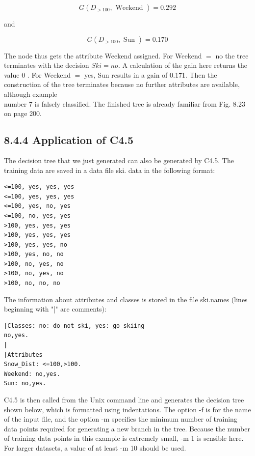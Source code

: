 \documentclass[10pt]{book}
\begin{document}
\begin{center}
\begin{enumerate}
\begin{center}
\begin{center}
$$
G\left(D_{>100}, \text { Weekend }\right)=0.292
$$

and

$$
G\left(D_{>100}, \text { Sun }\right)=0.170
$$

The node thus gets the attribute Weekend assigned. For Weekend $=$ no the tree terminates with the decision $S k i=n o$. A calculation of the gain here returns the value 0 . For Weekend $=$ yes, Sun results in a gain of 0.171. Then the construction of the tree terminates because no further attributes are available, although example\\
number 7 is falsely classified. The finished tree is already familiar from Fig. 8.23 on page 200.

\subsection*{8.4.4 Application of C4.5}
The decision tree that we just generated can also be generated by C4.5. The training data are saved in a data file ski. data in the following format:

\begin{verbatim}
<=100, yes, yes, yes
<=100, yes, yes, yes
<=100, yes, no, yes
<=100, no, yes, yes
>100, yes, yes, yes
>100, yes, yes, yes
>100, yes, yes, no
>100, yes, no, no
>100, no, yes, no
>100, no, yes, no
>100, no, no, no
\end{verbatim}

The information about attributes and classes is stored in the file ski.names (lines beginning with "|" are comments):

\begin{verbatim}
|Classes: no: do not ski, yes: go skiing
no,yes.
|
|Attributes
Snow_Dist: <=100,>100.
Weekend: no,yes.
Sun: no,yes.
\end{verbatim}

C4.5 is then called from the Unix command line and generates the decision tree shown below, which is formatted using indentations. The option -f is for the name of the input file, and the option -m specifies the minimum number of training data points required for generating a new branch in the tree. Because the number of training data points in this example is extremely small, -m 1 is sensible here. For larger datasets, a value of at least -m 10 should be used.


\end{center}
\end{center}
\end{enumerate}
\end{center}
\end{document}
